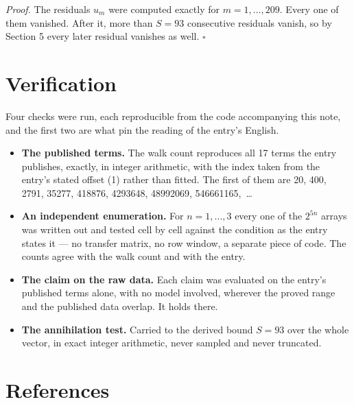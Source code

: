 \documentclass[11pt]{article}
\theoremstyle{definition}
\begin{document}
{\itshape Proof.} The residuals $u_m$ were computed exactly for $m = 1,\dots,209$. Every one of them vanished. After it, more than $S = 93$ consecutive residuals vanish, so by Section 5 every later residual vanishes as well. $\square$

\section{Verification}

Four checks were run, each reproducible from the code accompanying this note, and the first two are what pin the reading of the entry's English.

\begin{itemize}

\item {\bfseries The published terms.} The walk count reproduces all 17 terms the entry publishes, exactly, in integer arithmetic, with the index taken from the entry's stated offset (1) rather than fitted. The first of them are 20, 400, 2791, 35277, 418876, 4293648, 48992069, 546661165,~\dots

\item {\bfseries An independent enumeration.} For $n = 1,\dots,3$ every one of the $2^{5n}$ arrays was written out and tested cell by cell against the condition as the entry states it --- no transfer matrix, no row window, a separate piece of code. The counts agree with the walk count and with the entry.

\item {\bfseries The claim on the raw data.} Each claim was evaluated on the entry's published terms alone, with no model involved, wherever the proved range and the published data overlap. It holds there.

\item {\bfseries The annihilation test.} Carried to the derived bound $S = 93$ over the whole vector, in exact integer arithmetic, never sampled and never truncated.

\end{itemize}

\section{References}
\end{document}
